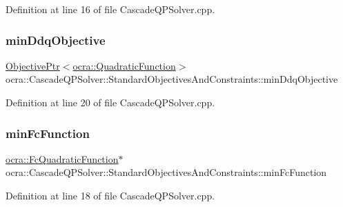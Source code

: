 Definition at line 16 of file Cascade\+Q\+P\+Solver.\+cpp.

\hypertarget{structocra_1_1CascadeQPSolver_1_1StandardObjectivesAndConstraints_a6fd5e2332a618501b07ed6c4265b1fb7}{}\label{structocra_1_1CascadeQPSolver_1_1StandardObjectivesAndConstraints_a6fd5e2332a618501b07ed6c4265b1fb7} 
\subsubsection{\texorpdfstring{min\+Ddq\+Objective}{minDdqObjective}}
{\footnotesize\ttfamily \hyperlink{classocra_1_1ObjectivePtr}{Objective\+Ptr}$<$\hyperlink{classocra_1_1QuadraticFunction}{ocra\+::\+Quadratic\+Function}$>$ ocra\+::\+Cascade\+Q\+P\+Solver\+::\+Standard\+Objectives\+And\+Constraints\+::min\+Ddq\+Objective}



Definition at line 20 of file Cascade\+Q\+P\+Solver.\+cpp.

\hypertarget{structocra_1_1CascadeQPSolver_1_1StandardObjectivesAndConstraints_aeb55f736a7826cf39bda57eff7114275}{}\label{structocra_1_1CascadeQPSolver_1_1StandardObjectivesAndConstraints_aeb55f736a7826cf39bda57eff7114275} 
\subsubsection{\texorpdfstring{min\+Fc\+Function}{minFcFunction}}
{\footnotesize\ttfamily \hyperlink{classocra_1_1FcQuadraticFunction}{ocra\+::\+Fc\+Quadratic\+Function}$\ast$ ocra\+::\+Cascade\+Q\+P\+Solver\+::\+Standard\+Objectives\+And\+Constraints\+::min\+Fc\+Function}



Definition at line 18 of file Cascade\+Q\+P\+Solver.\+cpp.


